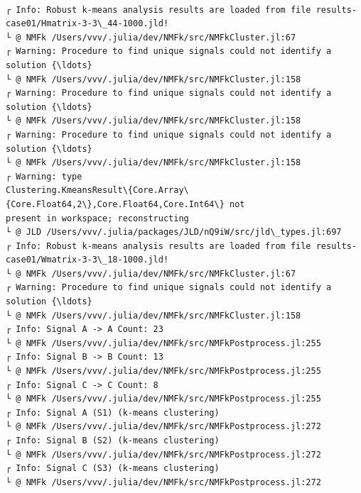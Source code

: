 \documentclass[11pt]{article}
\begin{document}
    
    \begin{center}
    \end{center}
    { \hspace*{\fill} \\}
    
    \begin{Verbatim}[commandchars=\\\{\}]
┌ Info: Robust k-means analysis results are loaded from file results-
case01/Hmatrix-3-3\_44-1000.jld!
└ @ NMFk /Users/vvv/.julia/dev/NMFk/src/NMFkCluster.jl:67
┌ Warning: Procedure to find unique signals could not identify a solution {\ldots}
└ @ NMFk /Users/vvv/.julia/dev/NMFk/src/NMFkCluster.jl:158
┌ Warning: Procedure to find unique signals could not identify a solution {\ldots}
└ @ NMFk /Users/vvv/.julia/dev/NMFk/src/NMFkCluster.jl:158
┌ Warning: Procedure to find unique signals could not identify a solution {\ldots}
└ @ NMFk /Users/vvv/.julia/dev/NMFk/src/NMFkCluster.jl:158
┌ Warning: type
Clustering.KmeansResult\{Core.Array\{Core.Float64,2\},Core.Float64,Core.Int64\} not
present in workspace; reconstructing
└ @ JLD /Users/vvv/.julia/packages/JLD/nQ9iW/src/jld\_types.jl:697
┌ Info: Robust k-means analysis results are loaded from file results-
case01/Wmatrix-3-3\_18-1000.jld!
└ @ NMFk /Users/vvv/.julia/dev/NMFk/src/NMFkCluster.jl:67
┌ Warning: Procedure to find unique signals could not identify a solution {\ldots}
└ @ NMFk /Users/vvv/.julia/dev/NMFk/src/NMFkCluster.jl:158
┌ Info: Signal A -> A Count: 23
└ @ NMFk /Users/vvv/.julia/dev/NMFk/src/NMFkPostprocess.jl:255
┌ Info: Signal B -> B Count: 13
└ @ NMFk /Users/vvv/.julia/dev/NMFk/src/NMFkPostprocess.jl:255
┌ Info: Signal C -> C Count: 8
└ @ NMFk /Users/vvv/.julia/dev/NMFk/src/NMFkPostprocess.jl:255
┌ Info: Signal A (S1) (k-means clustering)
└ @ NMFk /Users/vvv/.julia/dev/NMFk/src/NMFkPostprocess.jl:272
┌ Info: Signal B (S2) (k-means clustering)
└ @ NMFk /Users/vvv/.julia/dev/NMFk/src/NMFkPostprocess.jl:272
┌ Info: Signal C (S3) (k-means clustering)
└ @ NMFk /Users/vvv/.julia/dev/NMFk/src/NMFkPostprocess.jl:272
    \end{Verbatim}

    \begin{center}
    \end{center}
    { \hspace*{\fill} \\}
    
\end{document}
